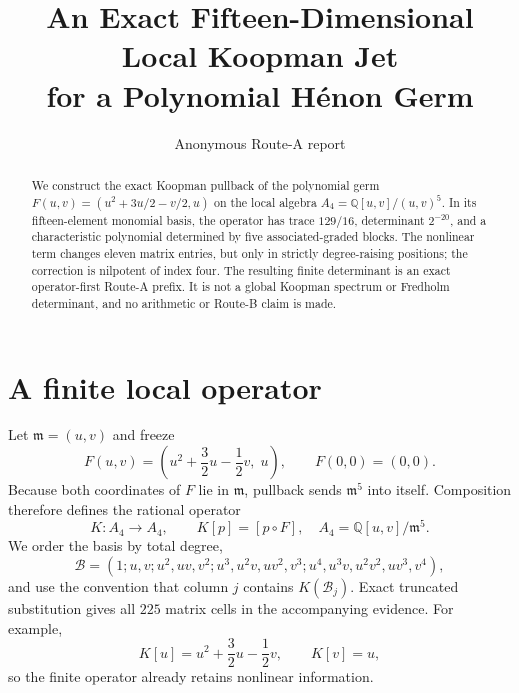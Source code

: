 \documentclass[10pt]{article}
\title{An Exact Fifteen-Dimensional Local Koopman Jet\\for a Polynomial H\'enon Germ}
\author{Anonymous Route-A report}
\date{}
\begin{document}
\maketitle

\begin{abstract}
We construct the exact Koopman pullback of the polynomial germ
$F(u,v)=(u^2+3u/2-v/2,u)$ on the local algebra
$A_4=\mathbb Q[u,v]/(u,v)^5$.  In its fifteen-element monomial basis, the
operator has trace $129/16$, determinant $2^{-20}$, and a characteristic
polynomial determined by five associated-graded blocks.  The nonlinear term
changes eleven matrix entries, but only in strictly degree-raising positions;
the correction is nilpotent of index four.  The resulting finite determinant
is an exact operator-first Route-A prefix.  It is not a global Koopman
spectrum or Fredholm determinant, and no arithmetic or Route-B claim is made.
\end{abstract}

\section{A finite local operator}
Let $\mathfrak m=(u,v)$ and freeze
\[
 F(u,v)=\left(u^2+\frac32u-\frac12v,\;u\right),
 \qquad F(0,0)=(0,0).
\]
Because both coordinates of $F$ lie in $\mathfrak m$, pullback sends
$\mathfrak m^5$ into itself.  Composition therefore defines the rational
operator
\[
 K:A_4\longrightarrow A_4,\qquad K[p]=[p\circ F],
 \quad A_4=\mathbb Q[u,v]/\mathfrak m^5.
\]
We order the basis by total degree,
\[
 \mathcal B=(1;u,v;u^2,uv,v^2;u^3,u^2v,uv^2,v^3;
 u^4,u^3v,u^2v^2,uv^3,v^4),
\]
and use the convention that column $j$ contains $K(\mathcal B_j)$.  Exact
truncated substitution gives all $225$ matrix cells in the accompanying
evidence.  For example,
\[
 K[u]=u^2+\frac32u-\frac12v,\qquad K[v]=u,
\]
so the finite operator already retains nonlinear information.
\end{document}
